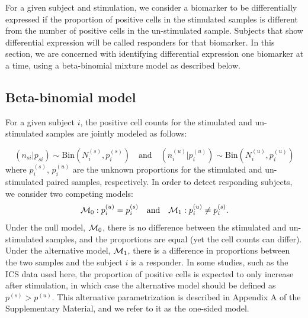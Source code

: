 \documentclass[12pt,oupdraft]{biostatistics}
\begin{document}
For a given subject and stimulation, we consider a biomarker to be differentially expressed if the proportion of positive cells in the stimulated samples is different from the number of positive cells in the un-stimulated sample. Subjects that show differential expression will be called responders for that biomarker. In this section, we are concerned with identifying differential expression one biomarker at a time, using a beta-binomial mixture model as described below.

\subsection{Beta-binomial model}
\label{s:DE}
For a given subject $i$, the positive cell counts for the stimulated and un-stimulated samples are jointly modeled as follows:

\begin{equation*}
(n_{si}|p_{si}) \sim \mathrm{Bin}(N^{(s)}_{i},p^{(s)}_{i})\quad \text{and}\quad (n^{(u)}_{i}|p^{(u)}_{i}) \sim \mathrm{Bin}(N^{(u)}_{i},p^{(u)}_{i})\label{eq:bino_likelihood}
\end{equation*}
where $p^{(s)}_{i}$, $p^{(u)}_{i}$ are the unknown proportions for the stimulated and un-stimulated paired samples, respectively. In order to detect responding subjects, we consider two competing models:
\begin{equation*}
{\cal M}_0: p^{(u)}_{i}=p^{(s)}_{i}\quad \text{and}\quad {\cal M}_1: p^{(u)}_{i}\ne p^{(s)}_{i}. \label{eq:models}
\end{equation*}
Under the null model, ${\cal M}_0$, there is no difference between the stimulated and un-stimulated samples, and the proportions are equal (yet the cell counts can differ). Under the alternative model, ${\cal M}_1$, there is a difference in proportions between the two samples and the subject $i$ is a responder. In some studies, such as the ICS data used here, the proportion of positive cells is expected to only increase after stimulation, in which case the alternative model should be defined as $p^{(s)}>p^{(u)}$. This alternative parametrization is described in Appendix A of the Supplementary Material, and we refer to it as the one-sided model.
\end{document}
